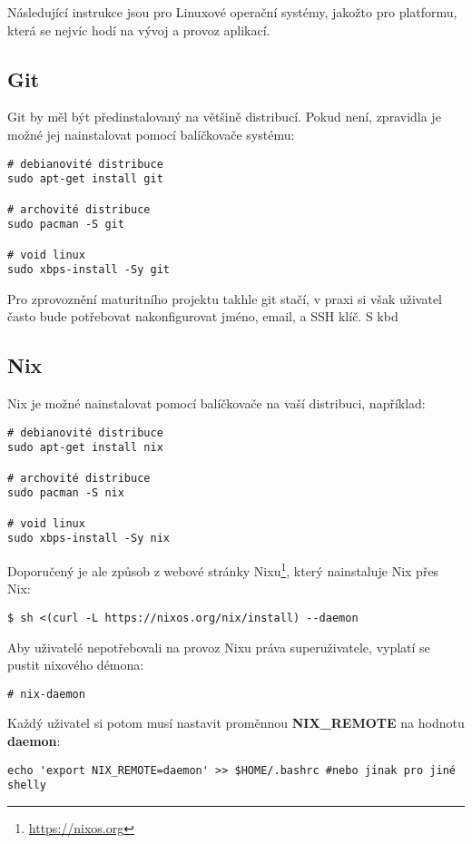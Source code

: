 \documentclass[11pt,a4paper,twoside,openright]{report}
\begin{document}
Následující instrukce jsou pro Linuxové operační systémy, jakožto pro platformu, která se nejvíc hodí
na vývoj a provoz aplikací.

\subsection{Git}
Git by měl být předinstalovaný na většině distribucí. Pokud není, zpravidla je možné jej
nainstalovat pomocí balíčkovače systému:

\begin{verbatim}
# debianovité distribuce
sudo apt-get install git

# archovité distribuce
sudo pacman -S git

# void linux
sudo xbps-install -Sy git
\end{verbatim}

Pro zprovoznění maturitního projektu takhle git stačí, v praxi si však uživatel často bude potřebovat
nakonfigurovat jméno, email, a SSH klíč.
 S kbd
\subsection{Nix}
Nix je možné nainstalovat pomocí balíčkovače na vaší distribuci, například:

\begin{verbatim}
# debianovité distribuce
sudo apt-get install nix

# archovité distribuce
sudo pacman -S nix

# void linux
sudo xbps-install -Sy nix
\end{verbatim}

Doporučený je ale způsob z webové stránky Nixu\footnote{\url{https://nixos.org}}, který nainstaluje
Nix přes Nix:
\begin{verbatim}
$ sh <(curl -L https://nixos.org/nix/install) --daemon
\end{verbatim}

Aby uživatelé nepotřebovali na provoz Nixu práva superuživatele, vyplatí se pustit nixového démona:
\begin{verbatim}
# nix-daemon
\end{verbatim}

Každý uživatel si potom musí nastavit proměnnou  {\bf NIX\_REMOTE} na hodnotu {\bf daemon}:

\begin{verbatim}
echo 'export NIX_REMOTE=daemon' >> $HOME/.bashrc #nebo jinak pro jiné shelly
\end{verbatim}
\end{document}
